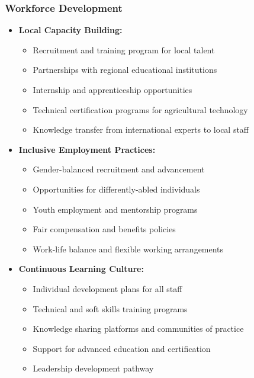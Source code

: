 \subsubsection{Workforce Development}
\begin{itemize}
    \item \textbf{Local Capacity Building:}
    \begin{itemize}
        \item Recruitment and training program for local talent
        \item Partnerships with regional educational institutions
        \item Internship and apprenticeship opportunities
        \item Technical certification programs for agricultural technology
        \item Knowledge transfer from international experts to local staff
    \end{itemize}
    
    \item \textbf{Inclusive Employment Practices:}
    \begin{itemize}
        \item Gender-balanced recruitment and advancement
        \item Opportunities for differently-abled individuals
        \item Youth employment and mentorship programs
        \item Fair compensation and benefits policies
        \item Work-life balance and flexible working arrangements
    \end{itemize}
    
    \item \textbf{Continuous Learning Culture:}
    \begin{itemize}
        \item Individual development plans for all staff
        \item Technical and soft skills training programs
        \item Knowledge sharing platforms and communities of practice
        \item Support for advanced education and certification
        \item Leadership development pathway
    \end{itemize}
\end{itemize}

